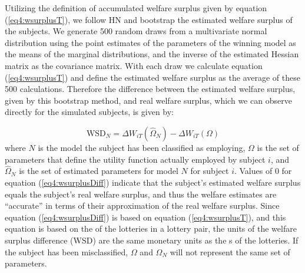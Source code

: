 \documentclass[../main.tex]{subfiles}
\begin{document}
Utilizing the definition of accumulated welfare surplus given by equation (\ref{eq4:wsurplusT}), we follow HN \parencite*[110-111]{Harrison2016} and bootstrap the estimated welfare surplus of the subjects.
We generate 500 random draws from a multivariate normal distribution using the point estimates of the parameters of the winning model as the means of the marginal distributions, and the inverse of the estimated Hessian matrix as the covariance matrix.{\footnotemark}
With each draw we calculate equation (\ref{eq4:wsurplusT}) and define the estimated welfare surplus as the average of these 500 calculations.
Therefore the difference between the estimated welfare surplus, given by this bootstrap method, and real welfare surplus, which we can observe directly for the simulated subjects, is given by:
\addtocounter{footnote}{-1}
\begin{equation}
	\label{eq4:wsurplusDiff}
	\text{WSD}_N = \Delta W_{iT}(\hat{\Omega}_N) - \Delta W_{iT}(\Omega)
\end{equation}
\noindent where $N$ is the model the subject has been classified as employing, $\Omega$ is the set of parameters that define the utility function actually employed by subject $i$, and $\hat{\Omega}_N$ is the set of estimated parameters for model $N$ for subject $i$.
Values of 0 for equation (\ref{eq4:wsurplusDiff}) indicate that the subject's estimated welfare surplus equals the subject's real welfare surplus, and thus the welfare estimates are \enquote{accurate} in terms of their approximation of the real welfare surplus.
Since equation (\ref{eq4:wsurplusDiff}) is based on equation (\ref{eq4:wsurplusT}), and this equation is based on the {\CE} of the lotteries in a lottery pair, the units of the welfare surplus difference (WSD) are the same monetary units as the {\CE}s of the lotteries.
If the subject has been misclassified, $\Omega$ and $\hat{\Omega}_N$ will not represent the same set of parameters.
\end{document}
